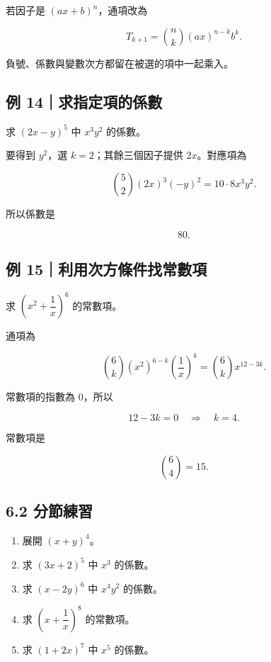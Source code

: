\documentclass[11pt,a4paper]{article}
\providecommand{\tightlist}{%
  \setlength{\itemsep}{0pt}\setlength{\parskip}{0pt}}
\begin{document}
若因子是 \((ax+b)^n\)，通項改為

\[
T_{k+1}=\binom nk (ax)^{n-k}b^k.
\]

負號、係數與變數次方都留在被選的項中一起乘入。

\subsection{例 14｜求指定項的係數}\label{ux4f8b-14ux6c42ux6307ux5b9aux9805ux7684ux4fc2ux6578}

求 \((2x-y)^5\) 中 \(x^3y^2\) 的係數。

要得到 \(y^2\)，選 \(k=2\)；其餘三個因子提供 \(2x\)。對應項為

\[
\binom52(2x)^3(-y)^2
=10\cdot8x^3y^2.
\]

所以係數是

\[
\boxed{80}.
\]

\subsection{例 15｜利用次方條件找常數項}\label{ux4f8b-15ux5229ux7528ux6b21ux65b9ux689dux4ef6ux627eux5e38ux6578ux9805}

求 \(\left(x^2+\dfrac1x\right)^6\) 的常數項。

通項為

\[
\binom6k(x^2)^{6-k}\left(\frac1x\right)^k
=\binom6k x^{12-3k}.
\]

常數項的指數為 \(0\)，所以

\[
12-3k=0\quad\Longrightarrow\quad k=4.
\]

常數項是

\[
\binom64=15.
\]

\subsection{6.2 分節練習}\label{ux5206ux7bc0ux7df4ux7fd2-5}

\begin{enumerate}
\def\labelenumi{\arabic{enumi}.}
\tightlist
\item
  展開 \((x+y)^4\)。
\item
  求 \((3x+2)^5\) 中 \(x^3\) 的係數。
\item
  求 \((x-2y)^6\) 中 \(x^4y^2\) 的係數。
\item
  求 \(\left(x+\dfrac1x\right)^8\) 的常數項。
\item
  求 \((1+2x)^7\) 中 \(x^5\) 的係數。
\end{enumerate}
\end{document}
